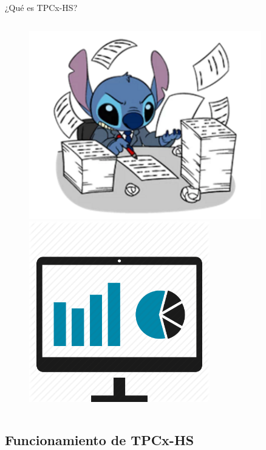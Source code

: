 \begin{frame}{¿Qué es TPCx-HS?}
\begin{columns}[c]
					\begin{figure}[h]
						\centering
						\includegraphics[width=0.9\textwidth]{./Images/hardwork.png}
						
						\includegraphics[width=0.7\textwidth]{./Images/benchmark.png}
					\end{figure}
			\end{columns}
		\end{frame}
	
	\subsection*{Funcionamiento de TPCx-HS}	

